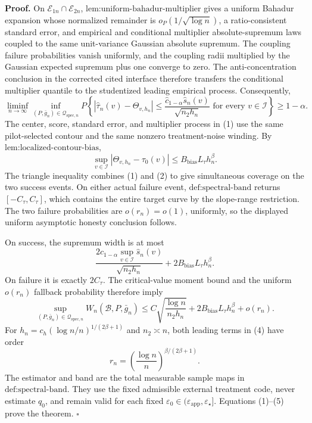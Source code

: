 \textbf{Proof.}
On \(\mathcal E_{1n}\cap\mathcal E_{2n}\), \(\text{lem:uniform-bahadur-multiplier}\) gives a uniform Bahadur expansion whose normalized remainder is \(o_P(1/\sqrt{\log n})\), a ratio-consistent standard error, and empirical and conditional multiplier absolute-supremum laws coupled to the same unit-variance Gaussian absolute supremum. The coupling failure probabilities vanish uniformly, and the coupling radii multiplied by the Gaussian expected supremum plus one converge to zero. The anti-concentration conclusion in the corrected cited interface therefore transfers the conditional multiplier quantile to the studentized leading empirical process. Consequently,
\[
 \liminf_{n\to\infty}\inf_{(P,\bar g_n)\in\mathcal Q_{\mathrm{spec},n}}
 P\left\{
 |\widehat\tau_n(v)-\Theta_{v,h_n}|
 \le\frac{\widehat c_{1-\alpha}\widehat s_n(v)}{\sqrt{n_2h_n}}
 \text{ for every }v\in\mathcal I
 \right\}\ge1-\alpha. \tag{1}
\]
The center, score, standard error, and multiplier process in (1) use the same pilot-selected contour and the same nonzero treatment-noise winding. By \(\text{lem:localized-contour-bias}\),
\[
 \sup_{v\in\mathcal I}|\Theta_{v,h_n}-\tau_0(v)|
 \le B_{\mathrm{bias}}L_\tau h_n^\beta. \tag{2}
\]
The triangle inequality combines (1) and (2) to give simultaneous coverage on the two success events. On either actual failure event, \(\text{def:spectral-band}\) returns \([-C_\tau,C_\tau]\), which contains the entire target curve by the slope-range restriction. The two failure probabilities are \(o(r_n)=o(1)\), uniformly, so the displayed uniform asymptotic honesty conclusion follows.

On success, the supremum width is at most
\[
 \frac{2\widehat c_{1-\alpha}\sup_{v\in\mathcal I}\widehat s_n(v)}{\sqrt{n_2h_n}}
 +2B_{\mathrm{bias}}L_\tau h_n^\beta. \tag{3}
\]
On failure it is exactly \(2C_\tau\). The critical-value moment bound and the uniform \(o(r_n)\) fallback probability therefore imply
\[
 \sup_{(P,\bar g_n)\in\mathcal Q_{\mathrm{spec},n}}
 W_n(\mathcal B,P,\bar g_n)
 \le C\sqrt{\frac{\log n}{n_2h_n}}
 +2B_{\mathrm{bias}}L_\tau h_n^\beta+o(r_n). \tag{4}
\]
For \(h_n=c_h(\log n/n)^{1/(2\beta+1)}\) and \(n_2\asymp n\), both leading terms in (4) have order
\[
 r_n=\left(\frac{\log n}{n}\right)^{\beta/(2\beta+1)}. \tag{5}
\]
The estimator and band are the total measurable sample maps in \(\text{def:spectral-band}\). They use the fixed admissible external treatment code, never estimate \(q_0\), and remain valid for each fixed \(\varepsilon_0\in(\varepsilon_{\mathrm{app}},\varepsilon_\star]\). Equations (1)--(5) prove the theorem. \(\square\)
